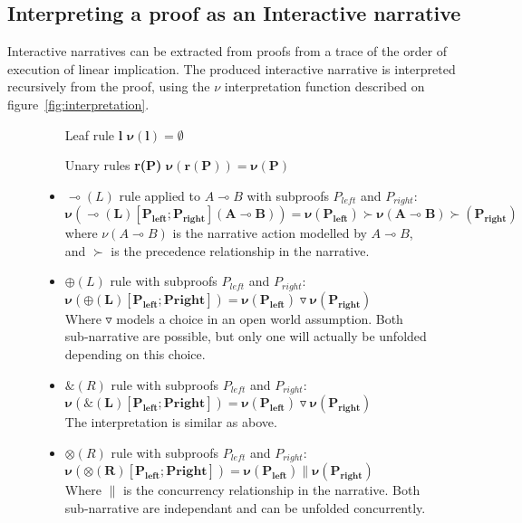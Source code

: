 \documentclass[runningheads,a4paper]{llncs}
\begin{document}
\subsection{Interpreting a proof as an Interactive narrative}
Interactive narratives can be extracted from proofs from a trace of the order of execution of linear implication. The produced interactive narrative is interpreted recursively from the proof, using the $\nu$ interpretation function described on figure~\ref{fig:interpretation}.
\begin{figure}
\begin{itemize}
\item [Leaf rule \textbf{l}] $\mathbf{\nu(l) = \emptyset}$
\item [Unary rules \textbf{r(P)}] $\mathbf{\nu(r(P)) = \nu(P)}$
\item $\multimap(L)$ rule applied to $A\multimap B$ with subproofs $P_{left}$ and $P_{right}$:\\
$\mathbf{\nu(\multimap(L)[P_{left};P_{right}](A\multimap B)) = \nu(P_{left}) \succ \nu(A \multimap B) \succ(P_{right})}$\\
where $\nu(A \multimap B)$ is the narrative action modelled by $A \multimap B$, and $\succ$ is the precedence relationship in the narrative.
\item $\oplus (L)$ rule with subproofs $P_{left}$ and $P_{right}$:\\ 
$\mathbf{\nu(\oplus(L)[P_{left};P{right}]) = \nu(P_{left}) \triangledown \nu(P_{right})}$\\ 
Where $\triangledown$ models a choice in an open world assumption. Both sub-narrative are possible, but only one will actually be unfolded depending on this choice.
\item $\& (R)$ rule with subproofs $P_{left}$ and $P_{right}$:\\ 
$\mathbf{\nu(\&(L)[P_{left};P{right}]) = \nu(P_{left}) \triangledown \nu(P_{right})}$\\ 
The interpretation is similar as above.
\item $\otimes (R)$ rule with subproofs $P_{left}$ and $P_{right}$:\\ 
$\mathbf{\nu(\otimes(R)[P_{left};P{right}]) = \nu(P_{left}) \| \nu(P_{right})}$ \\
Where $\|$ is the concurrency relationship in the narrative. Both sub-narrative are independant and can be unfolded concurrently.
\end{itemize}

\end{figure}
\end{document}
